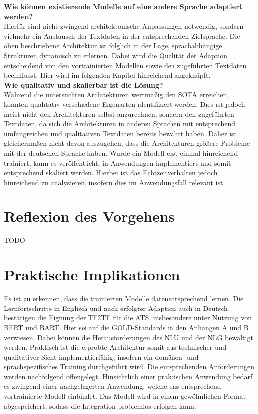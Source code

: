 \noindent
\textbf{Wie können existierende Modelle auf eine andere Sprache adaptiert werden?}\\
\noindent
Hierfür sind nicht zwingend architektonische Anpassungen notwendig, sondern vielmehr ein Austausch der Textdaten in der entsprechenden Zielsprache. Die oben beschriebene Architektur ist folglich in der Lage, sprachabhängige Strukturen dynamisch zu erlernen. Dabei wird die Qualität der Adaption entscheidend von den vortrainierten Modellen sowie den zugeführten Textdaten beeinflusst. Hier wird im folgenden Kapitel hinreichend angeknüpft.\\

\noindent
\textbf{Wie qualitativ und skalierbar ist die Lösung?}\\
\noindent
Während die untersuchten Architekturen wertmäßig den \ac{SOTA} erreichen, konnten qualitativ verschiedene Eigenarten identifiziert werden. Dies ist jedoch meist nicht den Architekturen selbst anzurechnen, sondern den zugeführten Textdaten, da sich die Architekturen in anderen Sprachen mit entsprechend umfangreichen und qualitativen Textdaten bereits bewährt haben. Daher ist gleichermaßen nicht davon auszugehen, dass die Architekturen größere Probleme mit der deutschen Sprache haben. Wurde ein Modell erst einmal hinreichend trainiert, kann es veröffentlicht, in Anwendungen implementiert und somit entsprechend skaliert werden. Hierbei ist das Echtzeitverhalten jedoch hinreichend zu analysieren, insofern dies im Anwendungsfall relevant ist.


\section{Reflexion des Vorgehens}
\noindent
TODO
\newpage


\section{Praktische Implikationen}
\noindent
Es ist zu erkennen, dass die trainierten Modelle datenentsprechend lernen. Die Lernfortschritte in Englisch und nach erfolgter Adaption auch in Deutsch bestätigen die Eignung der \ac{TF2TF} für die \ac{ATS}, insbesondere unter Nutzung von \ac{BERT} und \ac{BART}. Hier sei auf die GOLD-Standards in den Anhängen A und B verwiesen. Dabei können die Herausforderungen des \ac{NLU} und der \ac{NLG} bewältigt werden. Praktisch ist die erprobte Architektur somit aus technischer und qualitativer Sicht implementierfähig, insofern ein domänen- und sprachspezifisches Training durchgeführt wird. Die entsprechenden Anforderungen werden nachfolgend offengelegt. Hinsichtlich einer praktischen Anwendung bedarf es zwingend einer nachgelagerten Anwendung, welche das entsprechend vortrainierte Modell einbindet. Das Modell wird in einem gewöhnlichen Format abgespeichert, sodass die Integration problemlos erfolgen kann.


